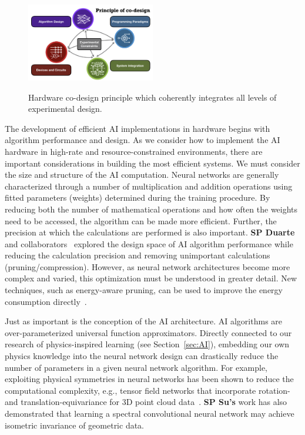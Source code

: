 \begin{figure}
\centering
\vskip-40pt
  {\includegraphics[keepaspectratio, width=0.5\textwidth]{proposal/img/codesign.png}}
  \caption{Hardware co-design principle which coherently integrates all levels of experimental design.}
  \label{fig:codesign}
  \vskip-15pt
\end{figure}
The development of efficient AI implementations in hardware begins with algorithm performance and design.
As we consider how to implement the AI hardware in high-rate and resource-constrained environments, there are important considerations in building the most efficient systems. We must consider the size and structure of the AI computation. Neural networks are generally characterized through a number of multiplication and addition operations using fitted parameters (weights) determined during the training procedure. By reducing both the number of mathematical operations and how often the weights need to be accessed, the algorithm can be made more efficient.  Further, the precision at which the calculations are performed is also important.
{\bf SP Duarte} and collaborators~\cite{Duarte:2018ite} explored the design space of AI algorithm performance while reducing the calculation precision and removing unimportant calculations (pruning/compression).  However, as neural network architectures become more complex and varied, this optimization must be understood in greater detail. New techniques, such as energy-aware pruning, can be used to improve the energy consumption directly~\cite{DBLP:journals/corr/YangCS16a}.

Just as important is the conception of the AI architecture. AI algorithms are over-parameterized universal function approximators. Directly connected to our research of physics-inspired learning (see Section~\ref{sec:AI}),  embedding our own physics knowledge into the neural network design can drastically reduce the number of parameters in a given neural network algorithm.  For example, exploiting physical symmetries in neural networks has been shown to reduce the computational complexity, e.g., tensor field networks that incorporate rotation- and translation-equivariance for 3D point cloud data~\cite{thomas2018tensor}. {\bf SP Su's} work has also demonstrated that learning a spectral convolutional neural network may achieve isometric invariance of geometric data. 

